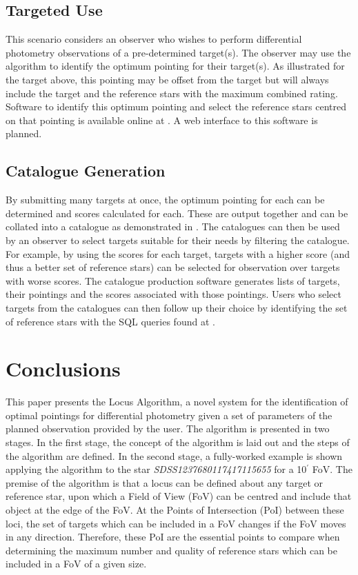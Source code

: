 \documentclass{aa}
\begin{document}
\subsection{Targeted Use}
This scenario considers an observer who wishes to perform differential photometry observations of a pre-determined target(s).  The observer may use the algorithm to identify the optimum pointing for their target(s).  As illustrated for the target above, this pointing may be offset from the target but will always include the target and the reference stars with the maximum combined rating.  Software to identify this optimum pointing and select the reference stars centred on that pointing is available online at \citet{githubrepo}.  A web interface to this software is planned. 

\subsection{Catalogue Generation}
By submitting many targets at once, the optimum pointing for each can be determined and scores calculated for each.  These are output together and can be collated into a catalogue as demonstrated in \citet{quasarpaper}. The catalogues can then be used by an observer to select targets suitable for their needs by filtering the catalogue. For example, by using the scores for each target, targets with a higher score (and thus a better set of reference stars) can be selected for observation over targets with worse scores.  The catalogue production software generates lists of targets, their pointings and the scores associated with those pointings.  Users who select targets from the catalogues can then follow up their choice by identifying the set of reference stars with the SQL queries found at \citet{githubrepo}.

\section{Conclusions}
\label{Conclusions}

This paper presents the Locus Algorithm, a novel system for the identification of optimal pointings for differential photometry given a set of parameters of the planned observation provided by the user. The algorithm is presented in two stages. In the first stage, the concept of the algorithm is laid out and the steps of the algorithm are defined. In the second stage, a fully-worked example is shown applying the algorithm to the star \textit{SDSS1237680117417115655} for a 10$^\prime$ FoV. The premise of the algorithm is that a locus can be defined about any target or reference star, upon which a Field of View (FoV) can be centred and include that object at the edge of the FoV. At the Points of Intersection (PoI) between these loci, the set of targets which can be included in a FoV changes if the FoV moves in any direction. Therefore, these PoI are the essential points to compare when
determining the maximum number and quality of reference stars which can be included in a FoV of a given size.
\end{document}
